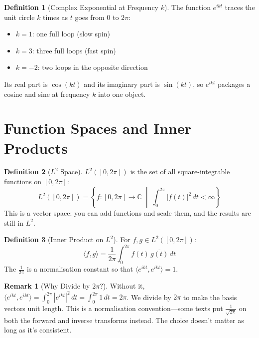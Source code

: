 \documentclass[11pt,a4paper]{article}
\theoremstyle{definition}
\newtheorem{definition}{Definition}[section]
\newtheorem{remark}{Remark}[section]
\begin{document}
\begin{definition}[Complex Exponential at Frequency $k$]
The function $e^{ikt}$ traces the unit circle $k$ times as $t$ goes from $0$ to $2\pi$:
\begin{itemize}
    \item $k = 1$: one full loop (slow spin)
    \item $k = 3$: three full loops (fast spin)
    \item $k = -2$: two loops in the opposite direction
\end{itemize}
Its real part is $\cos(kt)$ and its imaginary part is $\sin(kt)$, so $e^{ikt}$ packages a cosine and sine at frequency $k$ into one object.
\end{definition}

\section{Function Spaces and Inner Products}

\begin{definition}[$L^2$ Space]
$L^2([0, 2\pi])$ is the set of all square-integrable functions on $[0, 2\pi]$:
\begin{equation}
    L^2([0, 2\pi]) = \left\{ f : [0, 2\pi] \to \mathbb{C} \;\middle|\; \int_0^{2\pi} |f(t)|^2 \, dt < \infty \right\}
\end{equation}
This is a vector space: you can add functions and scale them, and the results are still in $L^2$.
\end{definition}

\begin{definition}[Inner Product on $L^2$]
For $f, g \in L^2([0, 2\pi])$:
\begin{equation}
    \langle f, g \rangle = \frac{1}{2\pi} \int_0^{2\pi} f(t) \, \overline{g(t)} \, dt
\end{equation}
The $\frac{1}{2\pi}$ is a normalisation constant so that $\langle e^{ikt}, e^{ikt} \rangle = 1$.
\end{definition}

\begin{remark}[Why Divide by $2\pi$?]
Without it, $\langle e^{ikt}, e^{ikt} \rangle = \int_0^{2\pi} |e^{ikt}|^2 \, dt = \int_0^{2\pi} 1 \, dt = 2\pi$. We divide by $2\pi$ to make the basis vectors unit length. This is a normalisation convention---some texts put $\frac{1}{\sqrt{2\pi}}$ on both the forward and inverse transforms instead. The choice doesn't matter as long as it's consistent.
\end{remark}
\end{document}
